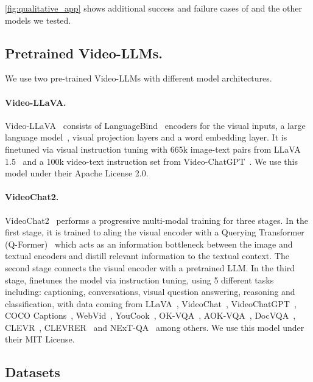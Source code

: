 

\autoref{fig:qualitative_app} shows additional success and failure cases of \method{} and the other models we tested.



\subsection{Pretrained Video-LLMs.}
\label{app:pretrained_vlm}
We use two pre-trained Video-LLMs with different model architectures.
\paragraph{Video-LLaVA.} Video-LLaVA~\cite{lin2023video} consists of LanguageBind~\cite{zhu2024languagebind} encoders for the visual inputs, a large language model~\cite{vicuna}, visual projection layers and a word embedding layer. It is finetuned via visual instruction tuning with 665k image-text pairs from LLaVA 1.5~\cite{llava} and a 100k video-text instruction set from Video-ChatGPT~\cite{videochatgpt}.
We use this model under their Apache License 2.0.

\paragraph{VideoChat2.} VideoChat2~\cite{li2023videochat} performs a progressive multi-modal training for three stages. In the first stage, it is trained to aling the visual encoder with a Querying Transformer (Q-Former)~\cite{blip2} which acts as an information bottleneck between the image and textual encoders and distill relevant information to the textual context. The second stage connects the visual encoder with a pretrained LLM. In the third stage, finetunes the model via instruction tuning, using 5 different tasks including: captioning, conversations,  visual question answering, reasoning and classification, with data coming from LLaVA~\cite{llava}, VideoChat~\cite{videochat}, VideoChatGPT~\cite{videochatgpt}, COCO Captions~\cite{coco}, WebVid~\cite{Bain2021FrozenIT}, YouCook~\cite{Das2013ATF}, OK-VQA~\cite{okvqa}, AOK-VQA~\cite{aokvqa}, DocVQA~\cite{docvqa}, CLEVR~\cite{clevr}, CLEVRER~\cite{clevrer} and NExT-QA~\cite{nextqa} among others.
We use this model under their MIT License.

\subsection{Datasets}
\label{app:datasets}

